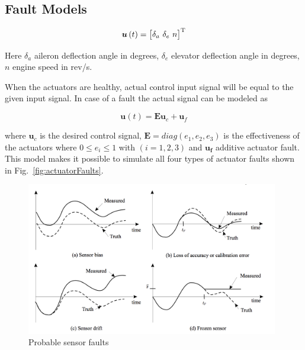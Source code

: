 \subsection{Fault Models}

\begin{equation}
\bm{u}\left(t\right)= \begin{bmatrix} {\delta}_{a}\ {\delta}_{e}\ n \end{bmatrix}^{\rm T}
\end{equation}

Here $ \delta_{a}$ aileron deflection angle in degrees, $ \delta_{e}$ elevator deflection angle in degrees, $n$ engine speed in rev/s. 


When the actuators are healthy, actual control input signal will be equal to the given input signal.
In case of a fault the actual signal can be modeled as

\begin{equation}
\bm{u}\left(t\right)= \bm{E}\bm{u}_c + \bm{u}_f
\end{equation}

where $\bm{u}_c $ is the desired control signal, $\bm{E} = diag(e_1, e_2, e_3)$ is the effectiveness of the actuators where $0 \leq e_i \leq 1 $ with $(i = 1, 2 ,3)$ and $\bm{u_f}$ additive actuator fault. This model makes it possible to simulate all four types of actuator faults shown in Fig.~\ref{fig:actuatorFaults}.


\begin{figure}
\begin{center}
\includegraphics[width=11cm]{figures/sensorFaults}    %
\caption{Probable sensor faults \cite{ducard2009fault}} 
\label{fig:sensorFaults}
\end{center}
\end{figure}

